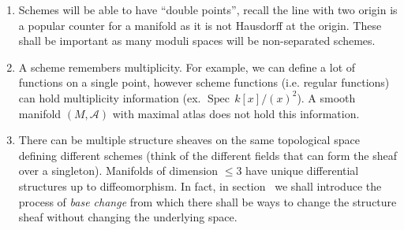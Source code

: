 \documentclass{article}
\newcommand{\A}{{\mathbb{A}}}
\newcommand{\R}{{\mathbb{R}}}
\newcommand{\CA}{{\mathcal{A}}}
\newcommand{\CO}{{\mathcal{O}}}
\newcommand{\Spec}{{\operatorname{Spec}\,}}
\newcommand{\sse}{\subseteq}
\begin{document}
\begin{enumerate}
		For an open embedding $X \hookrightarrow \A_R^n$ so that $X\cong U \sse A_\R^n$ where $U$ is open,
		this means that $X$ is a \emph{quasi-affine subscheme}, which by definition is an open subscheme of
		affine space. Their characterization is more complicated: the map $X \to \Spec(\CO_X(X))$ must be an
		open embedding and, as will be discussed in section~\cite[Quasi-Coherent Sheaves]{NateAlgGeo}, all quasi-coherent
		sheaves of $\CO_X$-modules must be generated by global sections. To check that each $\CO_X$-module is
		generated by global sections is difficult, there is a simpler characterization by the Goodman-Hartshorne Theorem
		\cite{hartshorneAmpleSubvarietiesAlgebraic2009}, but it is still a complicated characterization
		showing the greater complexities that arise when working with non-proper schemes.

		More generally, there shall be other interesting
		spaces to embed certain types of schemes into (ex. into toric varieties, Grassmannians, flag varieties,
		etc.) which shall have different purposes depending on what Moduli problem is being studied.
	\item Schemes will be able to have ``double points'', recall the line with two origin is a popular counter
		for a manifold as it is not Hausdorff at the origin. These shall be important as many moduli spaces
		will be non-separated schemes.
	\item A scheme remembers multiplicity. For example, we can define a lot of functions on a single point,
		however scheme functions (i.e. regular functions) can hold multiplicity information (ex. $\Spec
		k[x]/(x)^2$). A smooth manifold $(M, \CA)$ with maximal atlas does not hold this information.
	\item There can be multiple structure sheaves on the same topological space defining different schemes (think of the
		different fields that can form the sheaf over a singleton). Manifolds of dimension $\le 3$ have unique
		differential structures up to diffeomorphism. In fact, in section~\cite[Fibered Products]{NateAlgGeo} we shall
		introduce the process of \emph{base change} from which there shall be ways to change the structure
		sheaf without changing the underlying space.


\end{enumerate}
\end{document}
